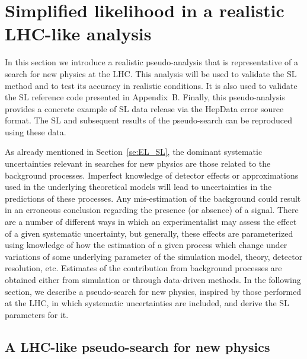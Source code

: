 \documentclass[11pt]{article}
\begin{document}
\section{Simplified likelihood in a  realistic LHC-like analysis }
\label{se:SL_LHC}


In this section we introduce a realistic pseudo-analysis that is representative of a search for new physics at the LHC. This analysis will be used to validate the SL method and to test  its accuracy in realistic conditions. It is also used to validate the SL reference code %
presented in Appendix~B.
Finally, this pseudo-analysis  provides a concrete example  of  SL data release via the HepData error source format. 
The SL and subsequent results of the pseudo-search can be reproduced using these data. 







As already mentioned in Section~\ref{se:EL_SL}, the dominant systematic uncertainties relevant in searches for new physics are those related to the background processes. 
Imperfect knowledge of detector effects or approximations used in the underlying theoretical models will lead to uncertainties in the predictions of these processes.
Any mis-estimation of the background could result in an erroneous conclusion regarding the presence (or absence) of a signal.
There are a number of different ways in which an experimentalist may assess the effect of a given systematic uncertainty, but generally, these effects are parameterized using knowledge of how the estimation of a given process which change under variations of some underlying parameter of the simulation model, theory, detector resolution, etc. Estimates of the contribution from background processes are obtained either from simulation or through  data-driven methods.
In the following section, we describe a pseudo-search for new physics, inspired by those performed at the LHC, in which systematic uncertainties are included, and derive the SL parameters for it.






\subsection{A LHC-like pseudo-search for new physics}
\label{se:toy_search}
\end{document}
